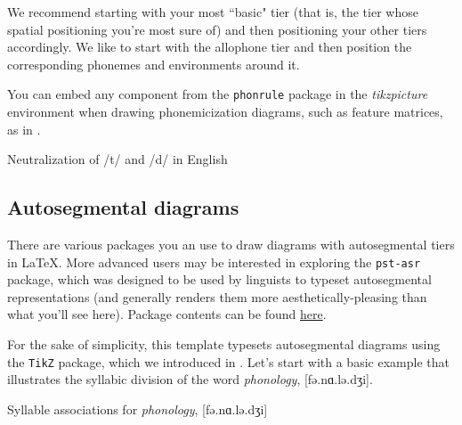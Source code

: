 \documentclass[output=paper,colorlinks,citecolor=brown,
]{langscibook}
\begin{document}
\noindent We recommend starting with your most ``basic" tier (that is, the tier whose spatial positioning you're most sure of) and then positioning your other tiers accordingly. We like to start with the allophone tier and then position the corresponding phonemes and environments around it.  


You can embed any component from the \texttt{phonrule} package in the \textit{tikzpicture} environment when drawing phonemicization diagrams, such as feature matrices, as in .

\ea Neutralization of /t/ and /d/ in English \label{ex:diercks:RuleNeut}

\z

\subsection{Autosegmental diagrams}\label{sec:diercks:autoseg}
There are various packages you an use to draw diagrams with autosegmental tiers in \LaTeX{}. More advanced users may be interested in exploring the \texttt{pst-asr} package, which was designed to be used by linguists to typeset autosegmental representations (and generally renders them more aesthetically-pleasing than what you'll see here). Package contents can be found \href{https://ctan.org/tex-archive/graphics/pstricks/contrib/pst-asr/}{here}. 

For the sake of simplicity, this template typesets autosegmental diagrams using the \texttt{TikZ} package, which we introduced in . Let's start with a basic example that illustrates the syllabic division of the word \textit{phonology}, [fə.nɑ.lə.dʒi].

\ea Syllable associations for \textit{phonology}, [fə.nɑ.lə.dʒi]
\end{document}
